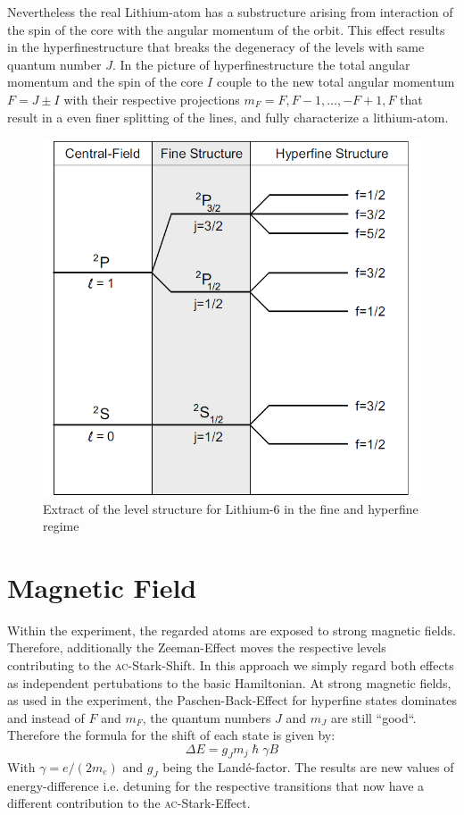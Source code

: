 Nevertheless the real Lithium-atom has a substructure arising from interaction of the spin of the core with the angular momentum of the orbit. This effect results in the hyperfinestructure that breaks the degeneracy of the levels with same quantum number $J$. In the picture of hyperfinestructure the total angular momentum and the spin of the core $I$ couple to the new total angular momentum $F=J\pm I$ with their respective projections $m_F=F,F-1,\dots,-F+1,F$ that result in a even finer splitting of the lines, and fully characterize a lithium-atom.

\begin{figure}[H]

\begin{center}
\includegraphics[scale=.5] {levels1}
\end{center}
\caption{Extract of the level structure for Lithium-6 in the fine and hyperfine regime \cite{gehm}}
\label{levels1}
\end{figure}

\section{Magnetic Field}

Within the experiment, the regarded atoms are exposed to strong magnetic fields. Therefore, additionally the Zeeman-Effect moves the respective levels contributing to the \textsc{ac}-Stark-Shift. In this approach we simply regard both effects as independent pertubations to the basic Hamiltonian. At strong magnetic fields, as used in the experiment, the Paschen-Back-Effect for hyperfine states dominates and instead of $F$ and $m_F$, the quantum numbers $J$ and $m_J$ are still “good“. Therefore the formula for the shift of each state is given by:
\begin{equation}
\Delta E=g_Jm_j\hslash\gamma B
\end{equation}
With $\gamma=e/(2m_e)$ and $g_J$ being the Landé-factor. The results are new values of energy-difference i.e. detuning for the respective transitions that now have a different contribution to the \textsc{ac}-Stark-Effect. 

